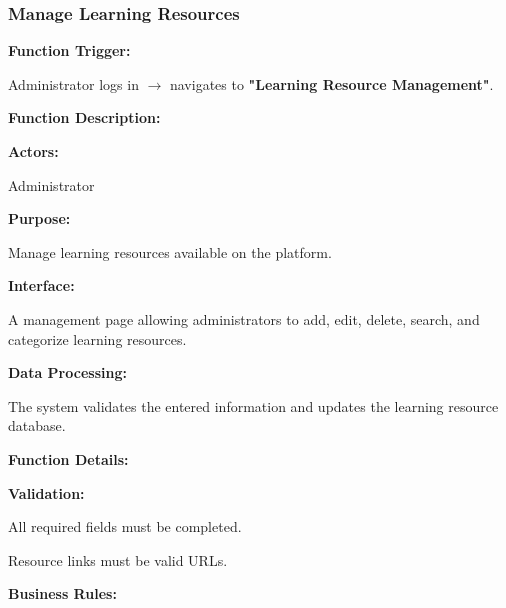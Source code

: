 %

\subsubsection{Manage Learning Resources}

\textbf{Function Trigger:}

Administrator logs in $\rightarrow$ navigates to \textbf{"Learning Resource Management"}.

\vspace{0.3cm}

\textbf{Function Description:}

\textbf{Actors:}

Administrator

\vspace{0.2cm}

\textbf{Purpose:}

Manage learning resources available on the platform.

\vspace{0.2cm}

\textbf{Interface:}

A management page allowing administrators to add, edit, delete, search, and categorize learning resources.

\vspace{0.2cm}

\textbf{Data Processing:}

The system validates the entered information and updates the learning resource database.

\vspace{0.3cm}

\textbf{Function Details:}

\textbf{Validation:}

All required fields must be completed.

Resource links must be valid URLs.

\textbf{Business Rules:}

